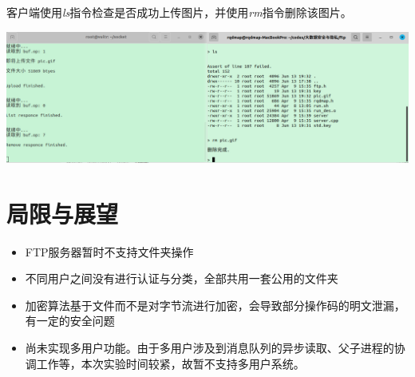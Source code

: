\documentclass{article}
\begin{document}
\begin{spacing}{2.0}
    客户端使用\textit{ls}指令检查是否成功上传图片，并使用\textit{rm}指令删除该图片。

\begin{center}
    \includegraphics[width=1\textwidth]{pic/4.png}
\end{center}
\section{局限与展望}
\begin{spacing}{1.5} \begin{itemize}
    \item FTP服务器暂时不支持文件夹操作
    \item 不同用户之间没有进行认证与分类，全部共用一套公用的文件夹
    \item 加密算法基于文件而不是对字节流进行加密，会导致部分操作码的明文泄漏，有一定的安全问题
    \item 尚未实现多用户功能。由于多用户涉及到消息队列的异步读取、父子进程的协调工作等，本次实验时间较紧，故暂不支持多用户系统。
\end{itemize} \end{spacing}

\end{spacing}
\end{document}
